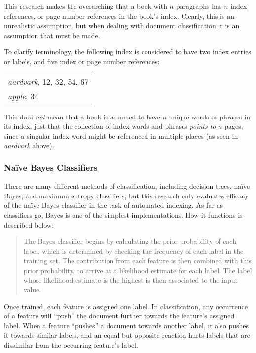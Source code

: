 This research makes the overarching that a book with $n$ paragraphs has $n$ index references, or page number references in the book's index.
Clearly, this is an unrealistic assumption, but when dealing with document classification it is an assumption that must be made.

To clarify terminology, the following index is considered to have two index entries or labels, and five index or page number references:

\begin{center}
\begin{tabular}{l}
\textit{aardvark}, 12, 32, 54, 67 \\
\textit{apple}, 34
\end{tabular} 


\end{center}

\noindent This does {\it not} mean that a book is assumed to have $n$ unique words or phrases in its index, just that the collection of index words and phrases {\it points to} $n$ pages, since a singular index word might be referenced in multiple places (as seen in {\it aardvark} above).

\subsubsection{Na{\"i}ve Bayes Classifiers}

There are many different methods of classification, including decision trees, na{\"i}ve Bayes, and maximum entropy classifiers\cite{nlpwp}, but this research only evaluates efficacy of the na{\"i}ve Bayes classifier in the task of automated indexing.
As far as classifiers go, \naive Bayes is one of the simplest implementations\cite{rish}.
How it functions is described below:
\begin{quote}
The \naive Bayes classifier begins by calculating the prior probability of each label, which is determined by checking the frequency of each label in the training set. The contribution from each feature is then combined with this prior probability, to arrive at a likelihood estimate for each label. The label whose likelihood estimate is the highest is then associated to the input value.\cite{nlpwp}
\end{quote}
\noindent Once trained, each feature is assigned one label.
In classification, any occurrence of a feature will ``push'' the document further towards the feature's assigned label.
When a feature ``pushes'' a document towards another label, it also pushes it towards similar labels, and an equal-but-opposite reaction hurts labels that are dissimilar from the occurring feature's label.

